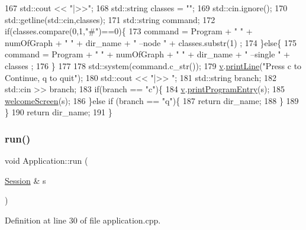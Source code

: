 \begin{DoxyCode}
167         std::cout << \textcolor{stringliteral}{"|>>"};
168         std::string classes = \textcolor{stringliteral}{""};
169         std::cin.ignore();
170         std::getline(std::cin,classes);
171         std::string command;
172         \textcolor{keywordflow}{if}(classes.compare(0,1,\textcolor{stringliteral}{"#"})==0)\{
173              command = Program + \textcolor{stringliteral}{" "} + numOfGraph + \textcolor{stringliteral}{" "} + dir\_name + \textcolor{stringliteral}{" --node "} + classes.substr(1) ;
174         \}\textcolor{keywordflow}{else}\{
175              command = Program + \textcolor{stringliteral}{" "} + numOfGraph + \textcolor{stringliteral}{" "} + dir\_name + \textcolor{stringliteral}{" --single "} + classes ;
176         \}
177         
178         std::system(command.c\_str());
179         \hyperlink{class_application_a96cff2295a95d7e6de06638bb7e61243}{v}.\hyperlink{class_visualize_abce6cd538dc0715b21851e0bf0377d85}{printLine}(\textcolor{stringliteral}{"Press c to Continue, q to quit"});
180         std::cout << \textcolor{stringliteral}{"|>> "};
181         std::string branch;
182         std::cin >> branch;
183         \textcolor{keywordflow}{if}(branch == \textcolor{stringliteral}{"c"})\{
184             \hyperlink{class_application_a96cff2295a95d7e6de06638bb7e61243}{v}.\hyperlink{class_visualize_a29f27ff8c5e59163eea2be42ff372405}{printProgramEntry}(s);
185             \hyperlink{class_application_abf73a60a6a2e4b83a675de777273d12c}{welcomeScreen}(s);
186         \}\textcolor{keywordflow}{else} \textcolor{keywordflow}{if} (branch == \textcolor{stringliteral}{"q"})\{
187             \textcolor{keywordflow}{return} dir\_name;
188         \}
189     \}
190     \textcolor{keywordflow}{return} dir\_name;
191 \}
\end{DoxyCode}
\mbox{\label{class_application_adecc88549e44815bd94985ea043b733f}} 
\subsubsection{\texorpdfstring{run()}{run()}}
{\footnotesize\ttfamily void Application\+::run (\begin{DoxyParamCaption}\item[{\hyperlink{struct_session}{Session} \&}]{s }\end{DoxyParamCaption})}



Definition at line 30 of file application.\+cpp.


